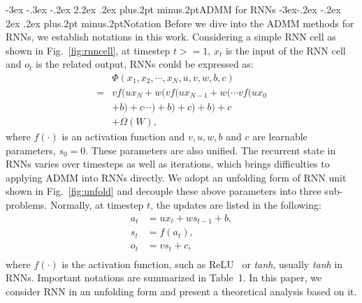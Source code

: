 \documentclass[twoside]{article}
\makeatletter
\def\section{\@startsection{section}{1}{\z@}%
 {-3ex \@plus -.3ex \@minus -.2ex}%
 {2.2ex \@plus.2ex}%
{\normalfont\normalsize\protect\baselineskip=14.5pt plus.2pt minus.2pt\bfseries}}
\def\subsection{\@startsection{subsection}{2}{\z@}%
 {-3ex\@plus -.2ex \@minus -.2ex}%
 {2ex \@plus.2ex}%
{\normalfont\normalsize\protect\baselineskip=12.5pt plus.2pt minus.2pt\bfseries}}
\makeatother
\begin{document}
\begin{multicols}{2}
\section{ADMM for RNNs}\label{sec:ADMM_RNN}
\subsection{Notation}\label{subsec:notions}
Before we dive into the ADMM methods for RNNs, we establish notations in this work.
Considering a simple RNN cell as shown in Fig.~\ref{fig:rnncell}, at timestep $t>=1$, $x_t$ is the input of the RNN cell and $o_t$ is the related output, RNNs could be expressed as:
\begin{equation}
\begin{array}{cl}
&\Phi(x_1, x_2, \cdots, x_N, u, v, w, b, c) \\
=& vf(ux_N+ w(vf(ux_{N-1}+ w(\cdots vf(ux_0 \\
& +b) + c \cdots)+b) + c)+b) + c\\
&+\Omega(W),
\end{array}
\end{equation} 
where $f(\cdot)$ is an activation function and $v, u, w, b$ and ${c}$ are learnable parameters, $s_0=0$. These parameters are also unified. The recurrent state in RNNs varies over timesteps as well as iterations, which brings difficulties to applying ADMM into RNNs directly. We adopt an unfolding form of RNN unit shown in Fig.~\ref{fig:unfold} and decouple these above parameters into three sub-problems.
Normally, at timestep $t$, the updates are listed in the following:
\begin{equation}
\begin{aligned}
    a_t & = ux_t + ws_{t-1} + b ,     \\
    s_t & = f(a_t)  ,                \\
    o_t & = vs_t + c ,               \\
\end{aligned}
\end{equation}
where $f(\cdot)$ is the activation function, such as ReLU~\cite{nair2010rectified}
or \textit{tanh}, usually \textit{tanh} in RNNs.
Important notations are summarized in Table~1. 
In this paper, we consider RNN in an unfolding form and present a theoretical analysis based on it. 


\end{multicols}
\end{document}
